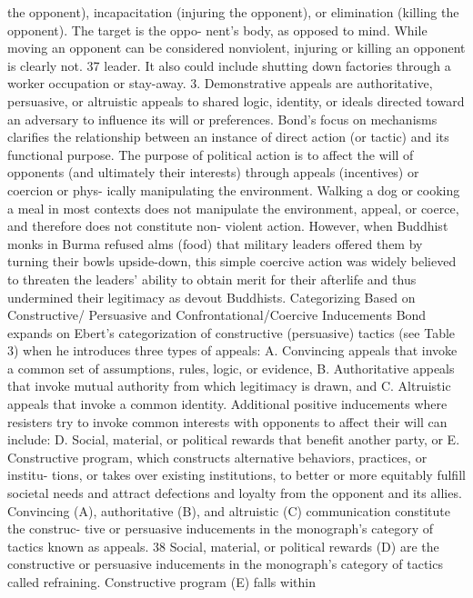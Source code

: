 \documentclass[twoside,a4paper,12pt,fleqn,openany]{extbook}
\begin{document}
the opponent), incapacitation (injuring the opponent), or elimination (killing the opponent). The target is the oppo-
nent’s body, as opposed to mind. While moving an opponent can be considered nonviolent, injuring or killing an
opponent is clearly not.
37
leader. It also could include shutting down factories through a worker occupation or
stay-away.
3.	 Demonstrative appeals are authoritative, persuasive, or altruistic appeals to shared
logic, identity, or ideals directed toward an adversary to influence its will or
preferences.
Bond’s focus on mechanisms clarifies the relationship between an instance of direct
action (or tactic) and its functional purpose. The purpose of political action is to affect the will
of opponents (and ultimately their interests) through appeals (incentives) or coercion or phys-
ically manipulating the environment. Walking a dog or cooking a meal in most contexts does
not manipulate the environment, appeal, or coerce, and therefore does not constitute non-
violent action. However, when Buddhist monks in Burma refused alms (food) that military
leaders offered them by turning their bowls upside-down, this simple coercive action was
widely believed to threaten the leaders’ ability to obtain merit for their afterlife and thus
undermined their legitimacy as devout Buddhists.
Categorizing Based on Constructive/
Persuasive and Confrontational/Coercive Inducements
Bond expands on Ebert’s categorization of constructive (persuasive) tactics (see Table 3)
when he introduces three types of appeals:
A.	 Convincing appeals that invoke a common set of assumptions, rules, logic, or
evidence,
B.	 Authoritative appeals that invoke mutual authority from which legitimacy is drawn,
and
C.	 Altruistic appeals that invoke a common identity.
Additional positive inducements where resisters try to invoke common interests with
opponents to affect their will can include:
D.	 Social, material, or political rewards that benefit another party, or
E.	 Constructive program, which constructs alternative behaviors, practices, or institu-
tions, or takes over existing institutions, to better or more equitably fulfill societal
needs and attract defections and loyalty from the opponent and its allies.
Convincing (A), authoritative (B), and altruistic (C) communication constitute the construc-
tive or persuasive inducements in the monograph’s category of tactics known as appeals.
38
Social, material, or political rewards (D) are the constructive or persuasive inducements in
the monograph’s category of tactics called refraining. Constructive program (E) falls within
\end{document}
